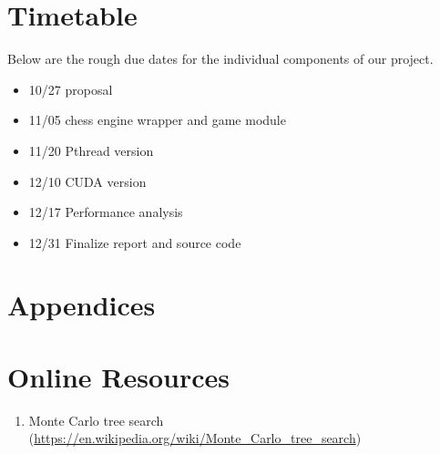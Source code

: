 \documentclass[sigconf]{acmart}
\begin{document}
\section{Timetable}
Below are the rough due dates for the individual components of our project. 
\begin{itemize}
  \item 10/27 proposal
  \item 11/05 chess engine wrapper and game module
  \item 11/20 Pthread version
  \item 12/10 CUDA version
  \item 12/17 Performance analysis
  \item 12/31 Finalize report and source code
  
\end{itemize}


\section{Appendices}



\appendix

\section{Online Resources}
\begin{enumerate}
  \item Monte Carlo tree search (\url{https://en.wikipedia.org/wiki/Monte_Carlo_tree_search})
  
\end{enumerate}
\end{document}
